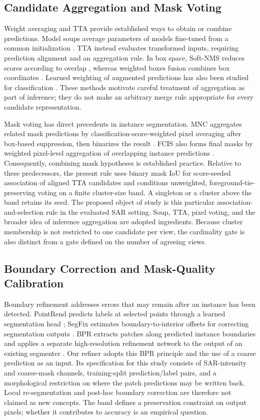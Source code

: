 \subsection{Candidate Aggregation and Mask Voting}
\label{sec:related-tta}
Weight averaging and TTA provide established ways to obtain or combine predictions. Model soups average parameters of models fine-tuned from a common initialization \cite{modelsoups2022}. TTA instead evaluates transformed inputs, requiring prediction alignment and an aggregation rule. In box space, Soft-NMS reduces scores according to overlap \cite{softnms2017}, whereas weighted boxes fusion combines box coordinates \cite{wbf2021}. Learned weighting of augmented predictions has also been studied for classification \cite{shanmugam2021}. These methods motivate careful treatment of aggregation as part of inference; they do not make an arbitrary merge rule appropriate for every candidate representation.

Mask voting has direct precedents in instance segmentation. MNC aggregates related mask predictions by classification-score-weighted pixel averaging after box-based suppression, then binarizes the result \cite{mnc2016}. FCIS also forms final masks by weighted pixel-level aggregation of overlapping instance predictions \cite{fcis2017}. Consequently, combining mask hypotheses is established practice. Relative to these predecessors, the present rule uses binary mask IoU for score-seeded association of aligned TTA candidates and conditions unweighted, foreground-tie-preserving voting on a finite cluster-size band. A singleton or a cluster above the band retains its seed. The proposed object of study is this particular association-and-selection rule in the evaluated SAR setting. Soup, TTA, pixel voting, and the broader idea of inference aggregation are adopted ingredients. Because cluster membership is not restricted to one candidate per view, the cardinality gate is also distinct from a gate defined on the number of agreeing views.

\subsection{Boundary Correction and Mask-Quality Calibration}
\label{sec:related-peft}
\label{sec:related-aniso}
Boundary refinement addresses errors that may remain after an instance has been detected. PointRend predicts labels at selected points through a learned segmentation head \cite{pointrend2020}; SegFix estimates boundary-to-interior offsets for correcting segmentation outputs \cite{segfix2020}. BPR extracts patches along predicted instance boundaries and applies a separate high-resolution refinement network to the output of an existing segmenter \cite{bpr2021}. Our refiner adopts this BPR principle and the use of a coarse prediction as an input. Its specification for this study consists of SAR-intensity and coarse-mask channels, training-split prediction/label pairs, and a morphological restriction on where the patch predictions may be written back. Local re-segmentation and post-hoc boundary correction are therefore not claimed as new concepts. The band defines a preservation constraint on output pixels; whether it contributes to accuracy is an empirical question.

